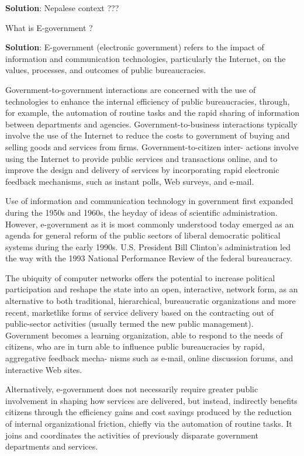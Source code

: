 \documentclass[
]{book}
\newcommand{\question}{\item}
\newenvironment{solution}{ {\bfseries Solution}:}{}
\begin{document}
\begin{questions}
\begin{solution}
Nepalese context ???

\end{solution}

\question What is E-government ?

\begin{solution}
E-government (electronic government) refers to the impact of information and communication technologies, particularly the Internet, on the values, processes, and outcomes of public bureaucracies.

Government-to-government interactions are concerned with the use of technologies to enhance the internal efficiency of public bureaucracies, through, for example, the automation of routine tasks and the rapid sharing of information between departments and agencies. Government-to-business interactions typically involve the use of the Internet to reduce the costs to government of buying and selling goods and services from firms. Government-to-citizen inter- actions involve using the Internet to provide public services and transactions online, and to improve the design and delivery of services by incorporating rapid electronic feedback mechanisms, such as instant polls, Web surveys, and e-mail.

Use of information and communication technology in government first expanded during the 1950s and 1960s, the heyday of ideas of scientific administration. However, e-government as it is most commonly understood today emerged as an agenda for general reform of the public sectors of liberal democratic political systems during the early 1990s. U.S. President Bill Clinton's administration led the way with the 1993 National Performance Review of the federal bureaucracy.

The ubiquity of computer networks offers the potential to increase political participation and reshape the state into an open, interactive, network form, as an alternative to both traditional, hierarchical, bureaucratic organizations and more recent, marketlike forms of service delivery based on the contracting out of public-sector activities (usually termed the new public management). Government becomes a learning organization, able to respond to the needs of citizens, who are in turn able to influence public bureaucracies by rapid, aggregative feedback mecha- nisms such as e-mail, online discussion forums, and interactive Web sites.

Alternatively, e-government does not necessarily require greater public involvement in shaping how services are delivered, but instead, indirectly benefits citizens through the efficiency gains and cost savings produced by the reduction of internal organizational friction, chiefly via the automation of routine tasks. It joins and coordinates the activities of previously disparate government departments and services.


\end{solution}
\end{questions}
\end{document}

